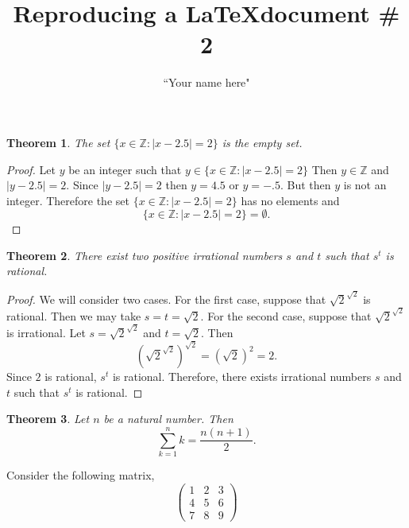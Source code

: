 \documentclass{article}  %
\title{Reproducing a \LaTeX document \# 2}
\author{``Your name here"}
\date{}
\newtheorem{thm}{Theorem}
\newcommand{\Z}{\mathbb{Z}}
\begin{document}
\maketitle


\begin{thm}
The set $\{ x\in\Z : |x-2.5| = 2 \}$ is the empty set.
\end{thm}

\begin{proof}
Let $y$ be an integer such that $y \in \{ x\in\Z : |x-2.5| = 2 \}$  Then $y\in \mathbb{Z}$ and $|y-2.5| = 2$.  Since $|y-2.5| = 2$ then $y = 4.5$ or $y=-.5$.  But then $y$ is not an integer.  Therefore the set $\{ x\in\Z : |x-2.5| = 2 \}$ has no elements and
\[\{ x\in\Z : |x-2.5| = 2 \} = \emptyset.\]
\end{proof}

\begin{thm}
There exist two positive irrational numbers $s$ and $t$ such that $s^t$ is rational.
\end{thm}
\begin{proof}
We will consider two cases.  For the first case, suppose that $\sqrt{2}^{\sqrt{2}}$ is rational.  Then we may take $s= t = \sqrt{2}$.  For the second case, suppose that $\sqrt{2}^{\sqrt{2}}$ is irrational.  Let $s= \sqrt{2}^{\sqrt{2}}$ and $t=\sqrt{2}$.  Then 
$$\left(\sqrt{2}^{\sqrt{2}}\right)^{\sqrt{2}} = \left(\sqrt{2}\right)^2 = 2.$$
Since $2$ is rational, $s^t$ is rational.  Therefore, there exists irrational numbers $s$ and $t$ such that $s^t$ is rational.
\end{proof}

\begin{thm}
Let $n$ be a natural number.  Then $$\sum_{k=1}^n k = \frac{n(n+1)}{2}.$$
\end{thm}

Consider the following matrix,
$$\left( \begin{array}{ccc}
1 &2 &3\\
4 &5 &6\\
7 &8 &9
\end{array}\right)$$
\end{document}

